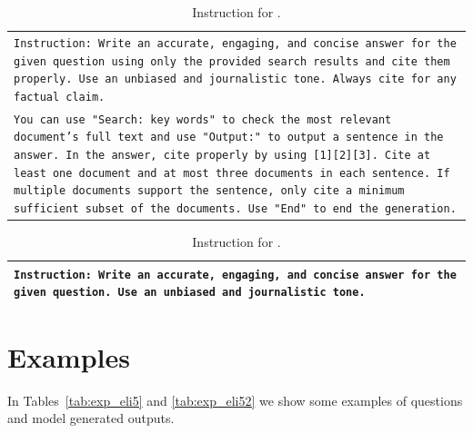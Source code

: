 \begin{table}[h]
    \centering
    \small
    \begin{tabular}{>{\raggedright\arraybackslash\tt}p{}<{}}
        \toprule
            Instruction: Write an accurate, engaging, and concise answer for the given question using only the provided search results and cite them properly. Use an unbiased and journalistic tone. Always cite for any factual claim.\\
           You can use "Search: key words" to check the most relevant document's full text and use "Output:" to output a sentence in the answer. In the answer, cite properly by using [1][2][3]. Cite at least one document and at most three documents in each sentence. If multiple documents support the sentence, only cite a minimum sufficient subset of the documents. Use "End" to end the generation.\\
        \bottomrule
    \end{tabular}
    \caption{
        Instruction for \search{}.
    }
    \label{tab:inst_search}
\end{table}

\begin{table}[h]
    \centering
    \small
    \begin{tabular}{>{\raggedright\arraybackslash\tt}p{}<{}}
        \toprule
            Instruction: Write an accurate, engaging, and concise answer for the given question. Use an unbiased and journalistic tone. \\
        \bottomrule
    \end{tabular}
    \caption{
        Instruction for \close{}.
    }
    \label{tab:prompt_close}
\end{table}


\section{Examples}

In Tables~\ref{tab:exp_eli5} and \ref{tab:exp_eli52} we show some examples of questions and model generated outputs. 


